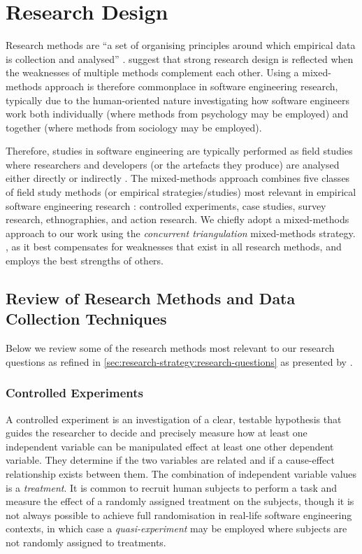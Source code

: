 \section{Research Design}
\label{sec:research-strategy:research-design}

Research methods are ``a set of organising principles around which empirical data is collection and analysed'' \citep{Easterbrook:2007ws}. \citet{Creswell:2017vn} suggest that strong research design is reflected when the weaknesses of multiple methods complement each other. Using a mixed-methods approach is therefore commonplace in software engineering research, typically due to the human-oriented nature investigating how software engineers work both individually (where methods from psychology may be employed) and together (where methods from sociology may be employed). 

Therefore, studies in software engineering are typically performed as field studies where researchers and developers (or the artefacts they produce) are analysed either directly or indirectly \citep{Singer:2007tu}. The mixed-methods approach combines five classes of field study methods (or empirical strategies/studies) most relevant in empirical software engineering research \citep{Easterbrook:2007ws, Wohlin:2012bu, Juristo:2013vj}: controlled experiments, case studies, survey research, ethnographies, and action research. We chiefly adopt a mixed-methods approach to our work using the \textit{concurrent triangulation} mixed-methods strategy. , as it best compensates for weaknesses that exist in all research methods, and employs the best strengths of others.



\subsection{Review of Research Methods and Data Collection Techniques}

Below we review some of the research methods most relevant to our research questions as refined in \cref{sec:research-strategy:research-questions} as presented by \citet{Easterbrook:2007ws}.

\subsubsection{Controlled Experiments}

A controlled experiment is an investigation of a clear, testable hypothesis that guides the researcher to decide and precisely measure how at least one independent variable can be manipulated effect at least one other dependent variable. They determine if the two variables are related and if a cause-effect relationship exists between them. The combination of independent variable values is a \textit{treatment}. It is common to recruit human subjects to perform a task and measure the effect of a randomly assigned treatment on the subjects, though it is not always possible to achieve full randomisation in real-life software engineering contexts, in which case a \textit{quasi-experiment} may be employed where subjects are not randomly assigned to treatments.

